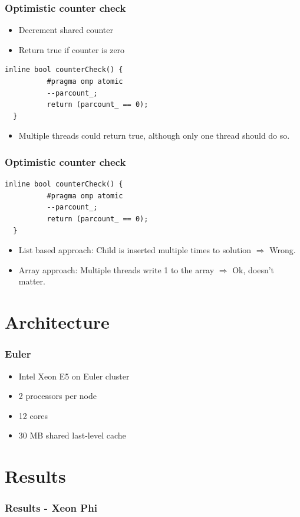 \begin{frame}[fragile]
 \frametitle{Optimistic counter check}
 \begin{itemize}
  \item Decrement shared counter
  \item Return true if counter is zero
 \end{itemize}
 \begin{lstlisting}[style=cpp]
  inline bool counterCheck() {
          #pragma omp atomic
          --parcount_;
          return (parcount_ == 0);
  }
 \end{lstlisting}
 \begin{itemize}
  \item Multiple threads could return true, although only one thread should do so.
 \end{itemize}
\end{frame}

\begin{frame}[fragile]
 \frametitle{Optimistic counter check}
  \begin{lstlisting}[style=cpp]
  inline bool counterCheck() {
          #pragma omp atomic
          --parcount_;
          return (parcount_ == 0);
  }
 \end{lstlisting}
 \begin{itemize}
  \item List based approach: Child is inserted multiple times to solution $\Rightarrow$ Wrong.
  \item Array approach: Multiple threads write 1 to the array $\Rightarrow$ Ok, doesn't matter.
 \end{itemize}
\end{frame}

\section{Architecture}
\frametitle{Euler}
\begin{itemize}
 \item Intel Xeon E5 on Euler cluster
 \item 2 processors per node
 \item 12 cores
 \item 30 MB shared last-level cache
\end{itemize}


\section{Results}

\begin{frame}
\frametitle{Results - Xeon Phi}



\end{frame}


 
